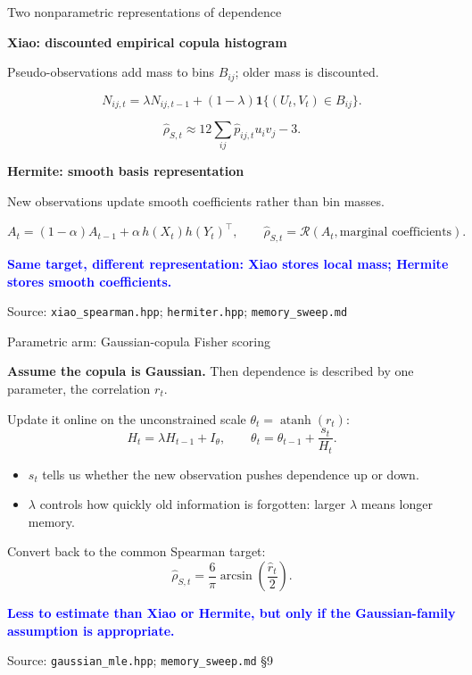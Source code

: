 \documentclass[aspectratio=169,11pt]{beamer}
\newcommand{\good}[1]{\textcolor{blue}{\textbf{#1}}}
\newcommand{\src}[1]{\vfill{\tiny\color{gray}Source: #1}}
\begin{document}
\begin{frame}{Two nonparametric representations of dependence}
  \small

  \textbf{Xiao: discounted empirical copula histogram}
  \par Pseudo-observations add mass to bins $B_{ij}$; older mass is discounted.

  \[
    N_{ij,t}
      = \lambda N_{ij,t-1}
      +(1-\lambda)\mathbf 1\{(U_t,V_t)\in B_{ij}\}.
  \]

  \[
    \widehat\rho_{S,t}
      \approx 12\sum_{ij}\widehat p_{ij,t}u_i v_j-3.
  \]

  \smallskip

  \textbf{Hermite: smooth basis representation}
  \par New observations update smooth coefficients rather than bin masses.

  \[
    A_t=(1-\alpha)A_{t-1}
        +\alpha\,h(X_t)h(Y_t)^\top,
    \qquad
    \widehat\rho_{S,t}
      =\mathcal R(A_t,\text{marginal coefficients}).
  \]

  \smallskip

  \good{Same target, different representation: Xiao stores local mass; Hermite stores smooth coefficients.}

  \src{\texttt{xiao\_spearman.hpp};
       \texttt{hermiter.hpp};
       \texttt{memory\_sweep.md}}
\end{frame}

\begin{frame}{Parametric arm: Gaussian-copula Fisher scoring}

  \textbf{Assume the copula is Gaussian.}
  Then dependence is described by one parameter, the correlation $r_t$.

  \medskip

  Update it online on the unconstrained scale
  $\theta_t=\operatorname{atanh}(r_t)$:
  \[
    H_t=\lambda H_{t-1}+I_\theta,
    \qquad
    \theta_t=\theta_{t-1}+\frac{s_t}{H_t}.
  \]

  \begin{itemize}
    \item $s_t$ tells us whether the new observation pushes dependence up or down.
    \item $\lambda$ controls how quickly old information is forgotten:
          larger $\lambda$ means longer memory.
  \end{itemize}

  Convert back to the common Spearman target:
  \[
    \widehat\rho_{S,t}
      =\frac{6}{\pi}\arcsin\!\left(\frac{\widehat r_t}{2}\right).
  \]

  \good{Less to estimate than Xiao or Hermite, but only if the Gaussian-family assumption is appropriate.}

  \src{\texttt{gaussian\_mle.hpp}; \texttt{memory\_sweep.md} \S9}
\end{frame}
\end{document}

